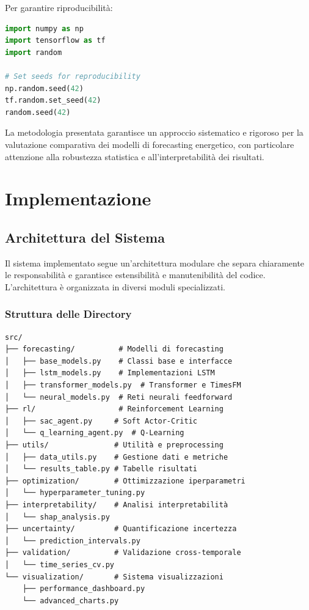 \documentclass[12pt,a4paper,twoside]{report}
\begin{document}
Per garantire riproducibilità:

\begin{lstlisting}[language=Python]
import numpy as np
import tensorflow as tf
import random

# Set seeds for reproducibility
np.random.seed(42)
tf.random.set_seed(42)
random.seed(42)
\end{lstlisting}

La metodologia presentata garantisce un approccio sistematico e rigoroso per la valutazione comparativa dei modelli di forecasting energetico, con particolare attenzione alla robustezza statistica e all'interpretabilità dei risultati.


\chapter{Implementazione}

\section{Architettura del Sistema}

Il sistema implementato segue un'architettura modulare che separa chiaramente le responsabilità e garantisce estensibilità e manutenibilità del codice. L'architettura è organizzata in diversi moduli specializzati.

\subsection{Struttura delle Directory}

\begin{lstlisting}
src/
├── forecasting/          # Modelli di forecasting
│   ├── base_models.py    # Classi base e interfacce
│   ├── lstm_models.py    # Implementazioni LSTM
│   ├── transformer_models.py  # Transformer e TimesFM
│   └── neural_models.py  # Reti neurali feedforward
├── rl/                   # Reinforcement Learning  
│   ├── sac_agent.py     # Soft Actor-Critic
│   └── q_learning_agent.py  # Q-Learning
├── utils/               # Utilità e preprocessing
│   ├── data_utils.py    # Gestione dati e metriche
│   └── results_table.py # Tabelle risultati
├── optimization/        # Ottimizzazione iperparametri
│   └── hyperparameter_tuning.py
├── interpretability/    # Analisi interpretabilità
│   └── shap_analysis.py
├── uncertainty/         # Quantificazione incertezza
│   └── prediction_intervals.py
├── validation/          # Validazione cross-temporale
│   └── time_series_cv.py
└── visualization/       # Sistema visualizzazioni
    ├── performance_dashboard.py
    └── advanced_charts.py
\end{lstlisting}
\end{document}
